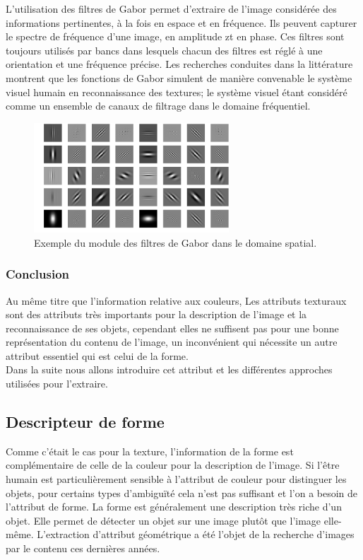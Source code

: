 L'utilisation des filtres de Gabor permet d'extraire de l'image considérée des informations pertinentes, à la fois en espace et en fréquence. Ils peuvent capturer le spectre de fréquence d'une image, en amplitude zt en phase. Ces filtres sont toujours utilisés par bancs dans lesquels chacun des filtres est réglé à une orientation et une fréquence précise. Les recherches conduites dans la littérature montrent que les fonctions de Gabor simulent de manière convenable le système visuel humain en reconnaissance des textures; le système visuel étant considéré comme un ensemble de canaux de filtrage dans le domaine fréquentiel.
 \begin{figure}[H]
 	\label{fig:gabor49}
 	\centering
 	\includegraphics[width=0.65\textwidth]{Figures/gabor49} %
 	
 	\caption{Exemple du module des filtres de Gabor dans le domaine spatial.}
 	
 \end{figure}
 
 
\subsubsection{Conclusion}

Au même titre que l'information relative aux couleurs, Les attributs texturaux sont des attributs très importants pour la description de l'image et la reconnaissance de ses objets, cependant elles ne suffisent pas pour une bonne représentation du contenu de l'image, un inconvénient qui nécessite un autre attribut essentiel qui est celui de la forme.\\

Dans la suite nous allons introduire cet attribut et les différentes approches utilisées pour
l'extraire.

\subsection{Descripteur de forme}
Comme c'était le cas pour la texture, l'information de la forme est complémentaire de celle de la couleur pour la description de l'image.  Si l'être humain est particulièrement sensible à l'attribut de couleur pour distinguer les objets, pour certains types d'ambiguïté cela n'est pas suffisant et l'on a besoin de l'attribut de forme. La forme est généralement une description très riche d’un objet. Elle permet de détecter un objet sur une image plutôt que l’image elle-même. L’extraction d’attribut géométrique a été l’objet de la recherche d’images par le contenu ces dernières années.\\

